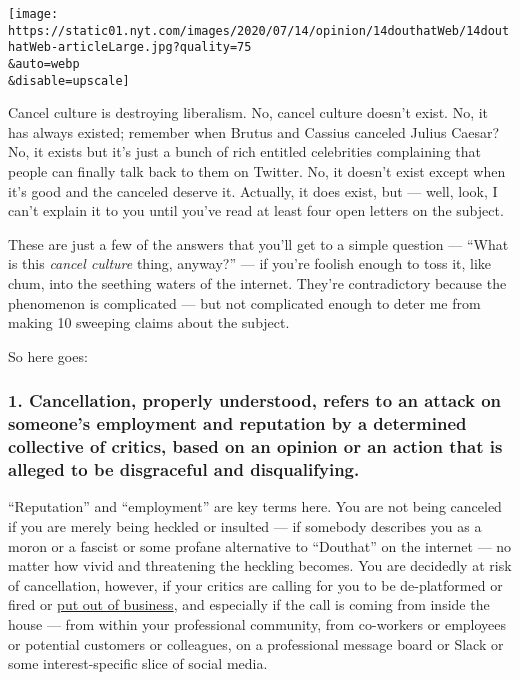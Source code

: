 \texttt{[image: https://static01.nyt.com/images/2020/07/14/opinion/14douthatWeb/14douthatWeb-articleLarge.jpg?quality=75\\\&auto=webp\\\&disable=upscale]}

Cancel culture is destroying liberalism. No, cancel culture doesn't
exist. No, it has always existed; remember when Brutus and Cassius
canceled Julius Caesar? No, it exists but it's just a bunch of rich
entitled celebrities complaining that people can finally talk back to
them on Twitter. No, it doesn't exist except when it's good and the
canceled deserve it. Actually, it does exist, but --- well, look, I
can't explain it to you until you've read at least four open letters on
the subject.

These are just a few of the answers that you'll get to a simple question
--- ``What is this \emph{cancel culture} thing, anyway?'' --- if you're
foolish enough to toss it, like chum, into the seething waters of the
internet. They're contradictory because the phenomenon is complicated
--- but not complicated enough to deter me from making 10 sweeping
claims about the subject.

So here goes:

\hypertarget{1-cancellation-properly-understood-refers-to-an-attack-on-someones-employment-and-reputation-by-a-determined-collective-of-critics-based-on-an-opinion-or-an-action-that-is-alleged-to-be-disgraceful-and-disqualifying}{%
\subsubsection{1. Cancellation, properly understood, refers to an attack
on someone's employment and reputation by a determined collective of
critics, based on an opinion or an action that is alleged to be
disgraceful and
disqualifying.}\label{1-cancellation-properly-understood-refers-to-an-attack-on-someones-employment-and-reputation-by-a-determined-collective-of-critics-based-on-an-opinion-or-an-action-that-is-alleged-to-be-disgraceful-and-disqualifying}}

``Reputation'' and ``employment'' are key terms here. You are not being
canceled if you are merely being heckled or insulted --- if somebody
describes you as a moron or a fascist or some profane alternative to
``Douthat'' on the internet --- no matter how vivid and threatening the
heckling becomes. You are decidedly at risk of cancellation, however, if
your critics are calling for you to be de-platformed or fired or
\href{https://coloradosun.com/2020/06/29/kindness-yoga-closure-during-black-lives-matter/}{put
out of business}, and especially if the call is coming from inside the
house --- from within your professional community, from co-workers or
employees or potential customers or colleagues, on a professional
message board or Slack or some interest-specific slice of social media.

